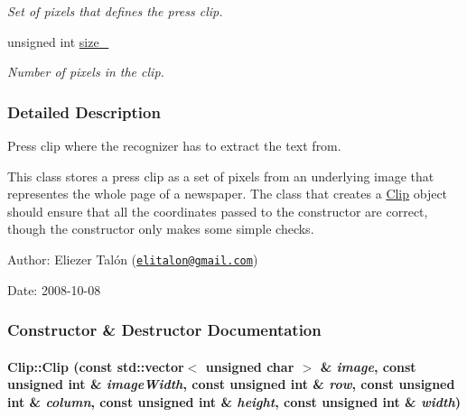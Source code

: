 \begin{CompactItemize}
\begin{CompactList}\small\item\em Set of pixels that defines the press clip. \item\end{CompactList}\item 
\hypertarget{class_clip_b88daf5fdd2b57dec8335ff8fd4a6d4e}{
unsigned int \hyperlink{class_clip_b88daf5fdd2b57dec8335ff8fd4a6d4e}{size\_\-}}
\label{class_clip_b88daf5fdd2b57dec8335ff8fd4a6d4e}

\begin{CompactList}\small\item\em Number of pixels in the clip. \item\end{CompactList}\end{CompactItemize}


\subsubsection{Detailed Description}
Press clip where the recognizer has to extract the text from. 

This class stores a press clip as a set of pixels from an underlying image that representes the whole page of a newspaper. The class that creates a \hyperlink{class_clip}{Clip} object should ensure that all the coordinates passed to the constructor are correct, though the constructor only makes some simple checks.

\begin{Desc}
\item[Author:]Eliezer Talón (\href{mailto:elitalon@gmail.com}{\tt elitalon@gmail.com}) \end{Desc}
\begin{Desc}
\item[Date:]2008-10-08 \end{Desc}


\subsubsection{Constructor \& Destructor Documentation}
\hypertarget{class_clip_6264e0334483ad8e0631842a18ac5bc9}{
\paragraph[{Clip}]{\setlength{\rightskip}{0pt plus 5cm}Clip::Clip (const std::vector$<$ unsigned char $>$ \& {\em image}, \/  const unsigned int \& {\em imageWidth}, \/  const unsigned int \& {\em row}, \/  const unsigned int \& {\em column}, \/  const unsigned int \& {\em height}, \/  const unsigned int \& {\em width})}\hfill}
\label{class_clip_6264e0334483ad8e0631842a18ac5bc9}


